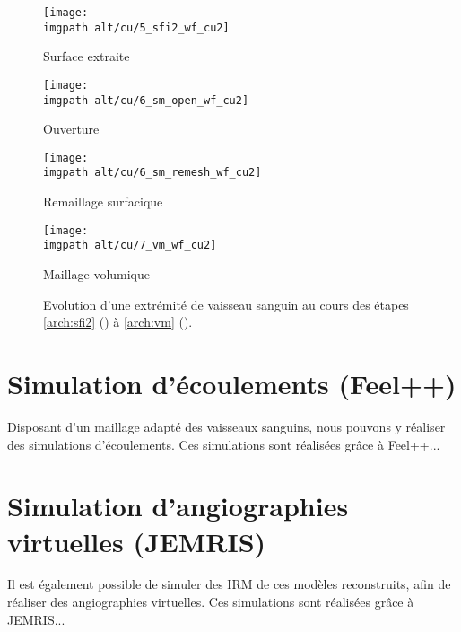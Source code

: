 \begin{center}
 \begin{figure}[H]
	\begin{minipage}[t]{\figpart \linewidth}
            	\centering
            	\texttt{[image: \\imgpath alt/cu/5\_sfi2\_wf\_cu2]}
		\caption*{Surface extraite}
	\end{minipage}
	\begin{minipage}[t]{\figpart \linewidth}
            	\centering
            	\texttt{[image: \\imgpath alt/cu/6\_sm\_open\_wf\_cu2]}
		\caption*{Ouverture}
	\end{minipage}
	\begin{minipage}[t]{\figpart \linewidth}
            	\centering
            	\texttt{[image: \\imgpath alt/cu/6\_sm\_remesh\_wf\_cu2]}
		\caption*{Remaillage surfacique}
	\end{minipage}
	\begin{minipage}[t]{\figpart \linewidth}
            	\centering
            	\texttt{[image: \\imgpath alt/cu/7\_vm\_wf\_cu2]}
		\caption*{Maillage volumique}
	\end{minipage}
	
	\caption{Evolution d'une extrémité de vaisseau sanguin au cours des étapes \ref{arch:sfi2} () à \ref{arch:vm} ().}
 \end{figure}
\end{center}

\section{Simulation d'écoulements (Feel++)}

Disposant d'un maillage adapté des vaisseaux sanguins, nous pouvons y réaliser des simulations d'écoulements. Ces simulations sont réalisées grâce à Feel++...

\section{Simulation d'angiographies virtuelles (JEMRIS)}

Il est également possible de simuler des IRM de ces modèles reconstruits, afin de réaliser des angiographies virtuelles. Ces simulations sont réalisées grâce à JEMRIS...


